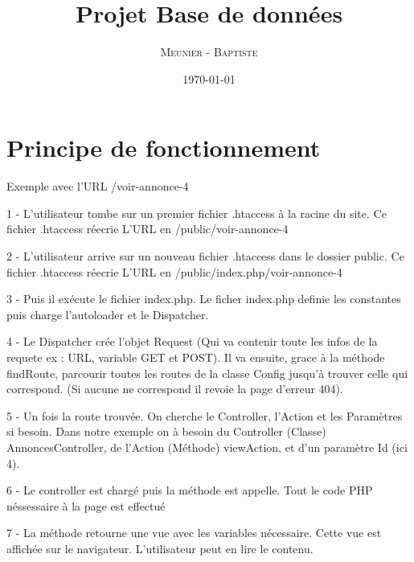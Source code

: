 \documentclass{book}
\title{Projet Base de données}
\author{\textsc{Meunier} - \textsc{Baptiste}}
\date{\today} %
\begin{document}
 
\maketitle %

    
\frontmatter
 
 \section{Principe de fonctionnement}

Exemple avec l'URL /voir-annonce-4

1 - L'utilisateur tombe sur un premier fichier .htaccess à la racine du site.
Ce fichier .htaccess réecrie L'URL en /public/voir-annonce-4

2 - L'utilisateur arrive sur un nouveau fichier .htaccess dans le dossier public.
Ce fichier .htaccess réecrie L'URL en /public/index.php/voir-annonce-4

3 - Puis il exécute le fichier index.php.
Le ficher index.php definie les constantes puis charge l'autoloader et le Dispatcher.

4 - Le Dispatcher crée l'objet Request (Qui va contenir toute les infos de la requete ex : URL, variable GET et POST).
Il va ensuite, grace à la méthode findRoute, parcourir toutes les routes de la classe Config jusqu'à trouver celle qui correspond. (Si aucune ne correspond il revoie la page d'erreur 404). 

5 - Un fois la route trouvée. On cherche le Controller, l'Action et les Paramètres si besoin.
Dans notre exemple on à besoin du Controller (Classe) AnnoncesController, de l'Action (Méthode) viewAction, et d'un paramètre Id (ici 4).

6 - Le controller est chargé puis la méthode est appelle. Tout le code PHP néssessaire à la page est effectué

7 - La méthode retourne une vue avec les variables nécessaire.
Cette vue est affichée sur le navigateur. L'utilisateur peut en lire le contenu. 
\end{document}
